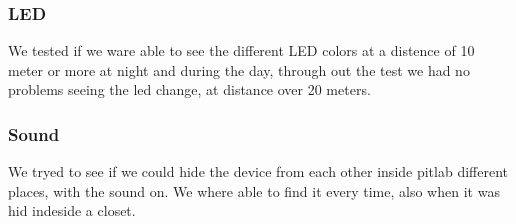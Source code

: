 \subsubsection{LED}
We tested if we ware able to see the different LED colors at a distence of 10 meter or more at night and during the day, through out the test we had no problems seeing the led change, at distance over 20 meters.

\subsubsection{Sound}
We tryed to see if we could hide the device from each other inside pitlab different places, with the sound on.
We where able to find it every time, also when it was hid indeside a closet.
